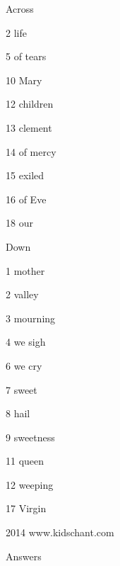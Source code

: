 \documentclass{article}
\begin{document}
\hskip 5cm\begin{minipage}[t]{5cm}
\noindent Across 

\begin{list}{}{}
\item[2]{life} 
\item[5]{	of tears} 
\item[10]{Mary} 
\item[12]{	children} 
\item[13]{clement} 
\item[14]{of mercy} 
\item[15]{	exiled} 
\item[16]{	of Eve} 
\item[18]{our} 
\end{list}
\end{minipage}\begin{minipage}[t]{5cm}
\noindent Down 

\begin{list}{}{}
\item[1]{mother} 
\item[2]{	valley} 
\item[3]{	mourning} 
\item[4]{	we sigh} 
\item[6]{	we cry} 
\item[7]{sweet} 
\item[8]{hail} 
\item[9]{sweetness} 
\item[11]{queen} 
\item[12]{	weeping} 
\item[17]{Virgin} 
\end{list}
\end{minipage}

\vfill

\centerline{2014 www.kidschant.com}


\eject

\centerline{{\huge Answers}}

\bigskip
\end{document}

